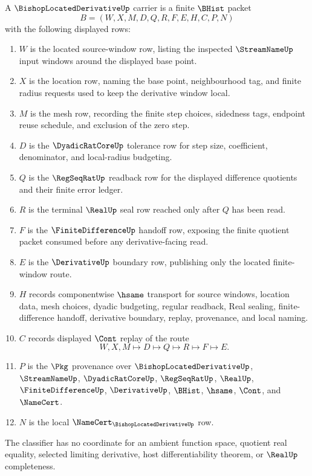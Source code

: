\begin{definition}
\label{def:bishop-located-derivative-carrier}
A $\BishopLocatedDerivativeUp$ carrier is a finite $\BHist$ packet
$$
B=(W,X,M,D,Q,R,F,E,H,C,P,N)
$$
with the following displayed rows:
\begin{enumerate}
\item $W$ is the located source-window row, listing the inspected $\StreamNameUp$ input windows around the displayed base point.
\item $X$ is the location row, naming the base point, neighbourhood tag, and finite radius requests used to keep the derivative window local.
\item $M$ is the mesh row, recording the finite step choices, sidedness tags, endpoint reuse schedule, and exclusion of the zero step.
\item $D$ is the $\DyadicRatCoreUp$ tolerance row for step size, coefficient, denominator, and local-radius budgeting.
\item $Q$ is the $\RegSeqRatUp$ readback row for the displayed difference quotients and their finite error ledger.
\item $R$ is the terminal $\RealUp$ seal row reached only after $Q$ has been read.
\item $F$ is the $\FiniteDifferenceUp$ handoff row, exposing the finite quotient packet consumed before any derivative-facing read.
\item $E$ is the $\DerivativeUp$ boundary row, publishing only the located finite-window route.
\item $H$ records componentwise $\hsame$ transport for source windows, location data, mesh choices, dyadic budgeting, regular readback, Real sealing, finite-difference handoff, derivative boundary, replay, provenance, and local naming.
\item $C$ records displayed $\Cont$ replay of the route
$$
W,X,M \longmapsto D \longmapsto Q \longmapsto R \longmapsto F \longmapsto E .
$$
\item $P$ is the $\Pkg$ provenance over $\BishopLocatedDerivativeUp$, $\StreamNameUp$, $\DyadicRatCoreUp$, $\RegSeqRatUp$, $\RealUp$, $\FiniteDifferenceUp$, $\DerivativeUp$, $\BHist$, $\hsame$, $\Cont$, and $\NameCert$.
\item $N$ is the local $\NameCert_{\BishopLocatedDerivativeUp}$ row.
\end{enumerate}
The classifier has no coordinate for an ambient function space, quotient real equality, selected limiting derivative, host differentiability theorem, or $\RealUp$ completeness.
\end{definition}


